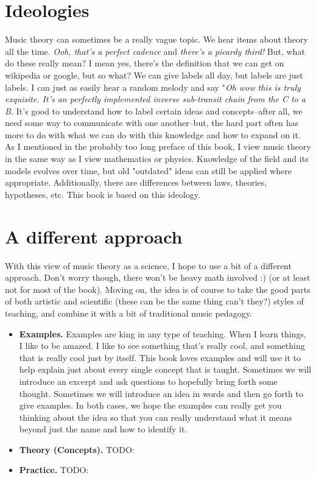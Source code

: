 \documentclass[../OpenAppliedMusicTheory.tex]{subfiles}
\begin{document}
    


    \section*{Ideologies}
    Music theory can sometimes be a really vague topic. We hear items about theory all the time. \emph{Ooh, that's a perfect cadence} and \emph{there's a picardy third!} But, what do these really mean? I mean yes, there's the definition that we can get on wikipedia or google, but so what? We can give labels all day, but labels are just labels. I can just as easily hear a random melody and say "\emph{Oh wow this is truly exquisite. It's an perfectly implemented inverse sub-transit chain from the C to a B.} It's good to understand how to label certain ideas and concepts--after all, we need some way to communicate with one another--but, the hard part often has more to do with what we can do with this knowledge and how to expand on it. As I mentioned in the probably too long preface of this book, I view music theory in the same way as I view mathematics or physics. Knowledge of the field and its models evolves over time, but old "outdated" ideas can still be applied where appropriate. Additionally, there are differences between laws, theories, hypotheses, etc. This book is based on this ideology. 

    \section*{A different approach}
    With this view of music theory as a science, I hope to use a bit of a different approach. Don't worry though, there won't be heavy math involved :) (or at least not for most of the book). Moving on, the idea is of course to take the good parts of both artistic and scientific (these can be the same thing can't they?) styles of teaching, and combine it with a bit of traditional music pedagogy.
    
    \begin{itemize}
        \item \textbf{Examples.} Examples are king in any type of teaching. When I learn things, I like to be amazed. I like to see something that's really cool, and something that is really cool just by itself. This book loves examples and will use it to help explain just about every single concept that is taught. Sometimes we will introduce an excerpt and ask questions to hopefully bring forth some thought. Sometimes we will introduce an idea in words and then go forth to give examples. In both cases, we hope the examples can really get you thinking about the idea so that you can really understand what it means beyond just the name and how to identify it.
        \item \textbf{Theory (Concepts).} TODO:
        \item \textbf{Practice.} TODO:
    \end{itemize}
\end{document}
